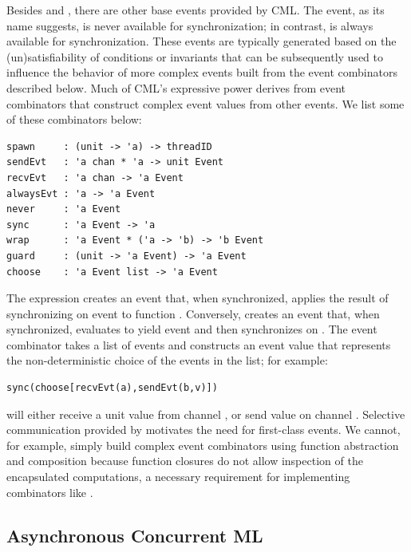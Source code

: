 Besides  and , there are other base events provided by
CML\@.  The  event, as its name suggests, is never available for
synchronization; in contrast,  is always available for
synchronization.  These events are typically generated based on the
(un)satisfiability of conditions or invariants that can be subsequently used to
influence the behavior of more complex events built from the event combinators
described below.  Much of CML's expressive power derives from event combinators
that construct complex event values from other events.  We list some of these
combinators below:
\vspace{5mm}

\lstset{numbers=none}
\begin{lstlisting}
spawn     : (unit -> 'a) -> threadID
sendEvt   : 'a chan * 'a -> unit Event
recvEvt   : 'a chan -> 'a Event
alwaysEvt : 'a -> 'a Event
never     : 'a Event
sync      : 'a Event -> 'a
wrap      : 'a Event * ('a -> 'b) -> 'b Event
guard     : (unit -> 'a Event) -> 'a Event
choose    : 'a Event list -> 'a Event
\end{lstlisting}

The expression  creates an event that, when synchronized,
applies the result of synchronizing on event  to function .
Conversely,  creates an event that, when synchronized, evaluates
 to yield event  and then synchronizes on .  The
 event combinator takes a list of events and constructs an event
value that represents the non-deterministic choice of the events in the list;
for example:
\vspace{5mm}

\lstset{numbers=none}
\begin{lstlisting}
sync(choose[recvEvt(a),sendEvt(b,v)])
\end{lstlisting}

\noindent will either receive a unit value from channel , or send value
 on channel .  Selective communication provided by 
motivates the need for first-class events. We cannot, for example, simply build
complex event combinators using function abstraction and composition because
function closures do not allow inspection of the encapsulated computations, a
necessary requirement for implementing combinators like .

\subsection{Asynchronous Concurrent ML}

